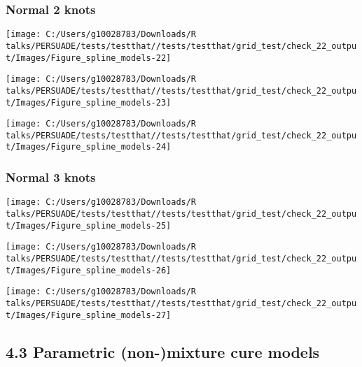 \documentclass[
]{article}
\begin{document}
\subsubsection{Normal 2 knots}\label{normal-2-knots}

\begin{flushleft}\texttt{[image: C:/Users/g10028783/Downloads/R talks/PERSUADE/tests/testthat//tests/testthat/grid\_test/check\_22\_output/Images/Figure\_spline\_models-22]} \end{flushleft}

\begin{flushleft}\texttt{[image: C:/Users/g10028783/Downloads/R talks/PERSUADE/tests/testthat//tests/testthat/grid\_test/check\_22\_output/Images/Figure\_spline\_models-23]} \end{flushleft}

\begin{flushleft}\texttt{[image: C:/Users/g10028783/Downloads/R talks/PERSUADE/tests/testthat//tests/testthat/grid\_test/check\_22\_output/Images/Figure\_spline\_models-24]} \end{flushleft}

\clearpage

\subsubsection{Normal 3 knots}\label{normal-3-knots}

\begin{flushleft}\texttt{[image: C:/Users/g10028783/Downloads/R talks/PERSUADE/tests/testthat//tests/testthat/grid\_test/check\_22\_output/Images/Figure\_spline\_models-25]} \end{flushleft}

\begin{flushleft}\texttt{[image: C:/Users/g10028783/Downloads/R talks/PERSUADE/tests/testthat//tests/testthat/grid\_test/check\_22\_output/Images/Figure\_spline\_models-26]} \end{flushleft}

\begin{flushleft}\texttt{[image: C:/Users/g10028783/Downloads/R talks/PERSUADE/tests/testthat//tests/testthat/grid\_test/check\_22\_output/Images/Figure\_spline\_models-27]} \end{flushleft}

\clearpage

\subsection{4.3 Parametric (non-)mixture cure
models}\label{parametric-non-mixture-cure-models}
\end{document}
